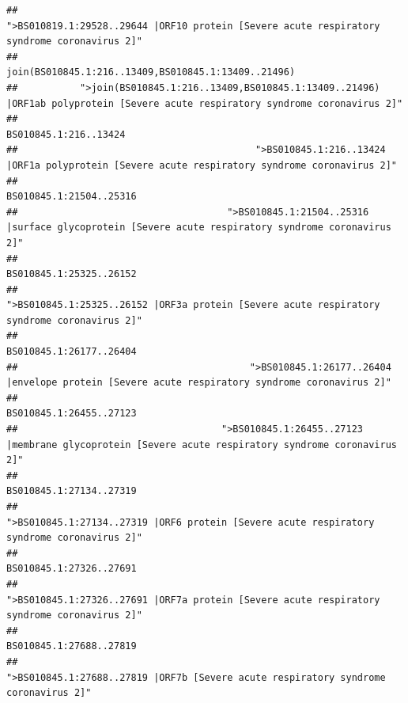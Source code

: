 \documentclass[
]{article}
\begin{document}
\begin{verbatim}
##                                            ">BS010819.1:29528..29644 |ORF10 protein [Severe acute respiratory syndrome coronavirus 2]" 
##                                                                                    join(BS010845.1:216..13409,BS010845.1:13409..21496) 
##           ">join(BS010845.1:216..13409,BS010845.1:13409..21496) |ORF1ab polyprotein [Severe acute respiratory syndrome coronavirus 2]" 
##                                                                                                                  BS010845.1:216..13424 
##                                          ">BS010845.1:216..13424 |ORF1a polyprotein [Severe acute respiratory syndrome coronavirus 2]" 
##                                                                                                                BS010845.1:21504..25316 
##                                     ">BS010845.1:21504..25316 |surface glycoprotein [Severe acute respiratory syndrome coronavirus 2]" 
##                                                                                                                BS010845.1:25325..26152 
##                                            ">BS010845.1:25325..26152 |ORF3a protein [Severe acute respiratory syndrome coronavirus 2]" 
##                                                                                                                BS010845.1:26177..26404 
##                                         ">BS010845.1:26177..26404 |envelope protein [Severe acute respiratory syndrome coronavirus 2]" 
##                                                                                                                BS010845.1:26455..27123 
##                                    ">BS010845.1:26455..27123 |membrane glycoprotein [Severe acute respiratory syndrome coronavirus 2]" 
##                                                                                                                BS010845.1:27134..27319 
##                                             ">BS010845.1:27134..27319 |ORF6 protein [Severe acute respiratory syndrome coronavirus 2]" 
##                                                                                                                BS010845.1:27326..27691 
##                                            ">BS010845.1:27326..27691 |ORF7a protein [Severe acute respiratory syndrome coronavirus 2]" 
##                                                                                                                BS010845.1:27688..27819 
##                                                    ">BS010845.1:27688..27819 |ORF7b [Severe acute respiratory syndrome coronavirus 2]" 

\end{verbatim}
\end{document}

